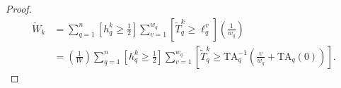 \documentclass[hidelinks, nonatbib]{elsarticle}
\begin{document}
\begin{get_theorem}[GET]
\begin{proof}
        \begin{align}
            \tilde{W}_{k}
            &=
            \sum_{q=1}^{n}
            \left[
                h_{q}^{k}
                \geq
                \frac{1}{2}
            \right]
            \sum_{v=1}^{w_q}
            \left[
                \tilde{T}_{q}^{k}
                \geq
                \ell_{q}^{v}
            \right]
            \left(
                \frac{1}{w_q}
            \right)
            \\
            &=
            \left(
                \frac{1}{W}
            \right)
            \sum_{q=1}^{n}
            \left[
                h_{q}^{k}
                \geq
                \frac{1}{2}
            \right]
            \sum_{v=1}^{w_q}
            \left[
                \tilde{T}_{q}^{k}
                \geq
                \text{TA}_{q}^{-1}
                \left(
                    \frac{v}{w_q}
                    +
                    \text{TA}_{q}(0)
                \right)
            \right]
            .
        \end{align}
    \end{proof}
\end{get_theorem}
\end{document}

